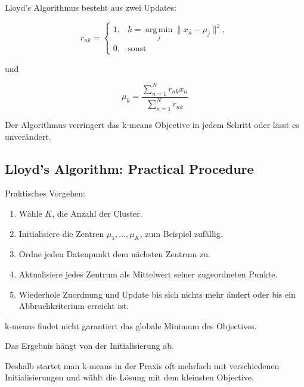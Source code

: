 \documentclass[11pt,a4paper]{scrartcl}
\begin{document}
\begin{answerbox}
    Lloyd's Algorithmus besteht aus zwei Updates:

    \[
        \boxed{
            r_{nk}
            =
            \begin{cases}
                1, & k = \operatorname*{arg\,min}_{j}\|x_n-\mu_j\|^2,\\
                0, & \text{sonst}
            \end{cases}
        }
    \]

    und

    \[
        \boxed{
            \mu_k
            =
            \frac{
                \sum_{n=1}^{N} r_{nk}x_n
            }{
                \sum_{n=1}^{N} r_{nk}
            }
        }
    \]

    Der Algorithmus verringert das k-means Objective in jedem Schritt oder lässt
    es unverändert.
\end{answerbox}

\subsection{Lloyd's Algorithm: Practical Procedure}

\begin{solutionbox}
    Praktisches Vorgehen:

    \begin{enumerate}
        \item Wähle \(K\), die Anzahl der Cluster.
        \item Initialisiere die Zentren \(\mu_1,\dots,\mu_K\), zum Beispiel zufällig.
        \item Ordne jeden Datenpunkt dem nächsten Zentrum zu.
        \item Aktualisiere jedes Zentrum als Mittelwert seiner zugeordneten Punkte.
        \item Wiederhole Zuordnung und Update bis sich nichts mehr ändert oder
        bis ein Abbruchkriterium erreicht ist.
    \end{enumerate}
\end{solutionbox}

\begin{notebox}
    k-means findet nicht garantiert das globale Minimum des Objectives.

    Das Ergebnis hängt von der Initialisierung ab.

    Deshalb startet man k-means in der Praxis oft mehrfach mit verschiedenen
    Initialisierungen und wählt die Lösung mit dem kleinsten Objective.
\end{notebox}
\end{document}
